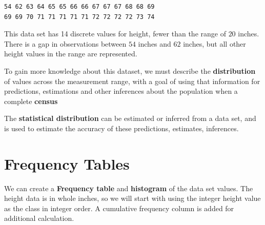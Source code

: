\documentclass[nohyper,justified]{tufte-handout}\usepackage[]{graphicx}\usepackage[]{color}
\makeatletter
\newenvironment{kframe}{%
 \def\at@end@of@kframe{}%
 \ifinner\ifhmode%
  \def\at@end@of@kframe{\end{minipage}}%
  \begin{minipage}{\columnwidth}%
 \fi\fi%
 \def\FrameCommand##1{\hskip\@totalleftmargin \hskip-\fboxsep
 \colorbox{shadecolor}{##1}\hskip-\fboxsep
     \hskip-\linewidth \hskip-\@totalleftmargin \hskip\columnwidth}%
 \MakeFramed {\advance\hsize-\width
   \@totalleftmargin\z@ \linewidth\hsize
   \@setminipage}}%
 {\par\unskip\endMakeFramed%
 \at@end@of@kframe}
\newenvironment{knitrout}{}{} %
\makeatother
\begin{document}
\begin{knitrout}
\color{fgcolor}\begin{kframe}
\begin{verbatim}
54 62 63 64 65 65 66 66 67 67 67 68 68 69
69 69 70 71 71 71 71 71 72 72 72 72 73 74
\end{verbatim}
\end{kframe}
\end{knitrout}

This data set has 14 discrete values for height, fewer than the range of $20$ inches. There is a gap in observations between $54$ inches and $62$ inches, but all other height values in the range are represented.

To gain more knowledge about this dataset, we must describe the \textbf{distribution} of values across the measurement range, with a goal of using that information for predictions, estimations and other inferences about the population when a complete \textbf{census} 

The \textbf{statistical distribution} can be estimated or inferred from a data set, and 
is used to estimate the accuracy of these predictions, estimates, inferences.

\section{Frequency Tables}
We can create a \textbf{Frequency table} and \textbf{histogram} of the data set values. The height data is in whole inches, so we will start with using the integer height value as the class in integer order. A cumulative frequency column is added for additional calculation.
\end{document}
